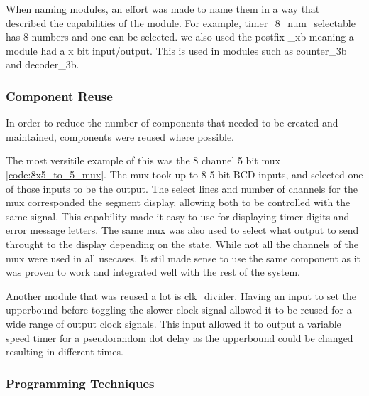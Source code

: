 \documentclass[11pt]{article}
\begin{document}
When naming modules, an effort was made to name them in a way that described the capabilities of the module. For example, timer\_8\_num\_selectable has 8 numbers and one can be selected. we also used the postfix \_xb meaning a module had a x bit input/output. This is used in modules such as counter\_3b and decoder\_3b.



\subsubsection{Component Reuse}

In order to reduce the number of components that needed to be created and maintained, components were reused where possible. 

The most versitile example of this was the 8 channel 5 bit mux \ref{code:8x5_to_5_mux}. The mux took up to 8 5-bit BCD inputs, and selected one of those inputs to be the output. The select lines and number of channels for the mux corresponded the segment display, allowing both to be controlled with the same signal. This capability made it easy to use for displaying timer digits and error message letters. The same mux was also used to select what output to send throught to the display depending on the state. While not all the channels of the mux were used in all usecases. It stil made sense to use the same component as it was proven to work and integrated well with the rest of the system.

Another module that was reused a lot is clk\_divider. Having an input to set the upperbound before toggling the slower clock signal allowed it to be reused for a wide range of output clock signals. This input allowed it to output a variable speed timer for a pseudorandom dot delay as the upperbound could be changed resulting in different times.

\subsubsection{Programming Techniques}
\end{document}
